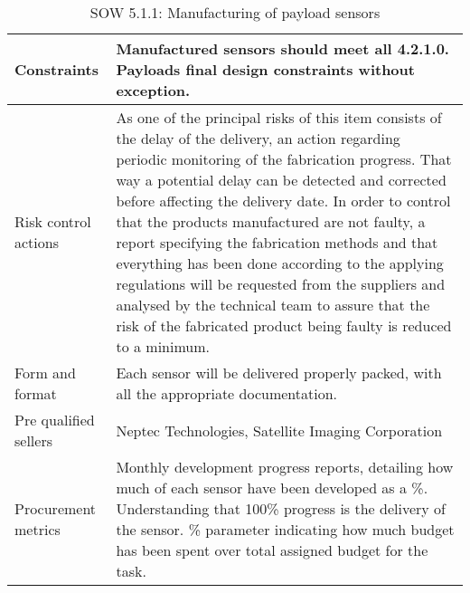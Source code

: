 \begin{table}[H]
\begin{tabular}{>{\raggedright\arraybackslash}p{3cm} >{\arraybackslash}p{11cm}}
		\midrule
		
		Constraints & Manufactured sensors should meet all 4.2.1.0. Payloads final design constraints without exception.\vspace{0.2cm} \\
		
		\midrule
		
		Risk control actions & As one of the principal risks of this item consists of the delay of the delivery, an action regarding periodic monitoring of the fabrication progress. That way a potential delay can be detected and corrected before affecting the delivery date.
		In order to control that the products manufactured are not faulty, a report specifying the fabrication methods and that everything has been done according to the applying regulations will be requested from the suppliers and analysed by the technical team to assure that the risk of the fabricated product being faulty is reduced to a minimum.\vspace{0.2cm} \\
		
		\midrule
		
		Form and format & Each sensor will be delivered properly packed, with all the appropriate documentation.\vspace{0.2cm} \\
		
		\midrule
		
		Pre qualified sellers & Neptec Technologies, Satellite Imaging Corporation \vspace{0.2cm} \\
		
		\midrule
		
		Procurement metrics & Monthly development progress reports, detailing how much of each sensor have been developed as a \%. Understanding that 100\% progress is the delivery of the sensor. \% parameter indicating how much budget has been spent over total assigned budget for the task. \vspace{0.2cm} \\
		
		\bottomrule[2pt]		
		
	\end{tabular}
	\caption{SOW 5.1.1: Manufacturing of payload sensors}
\end{table}


